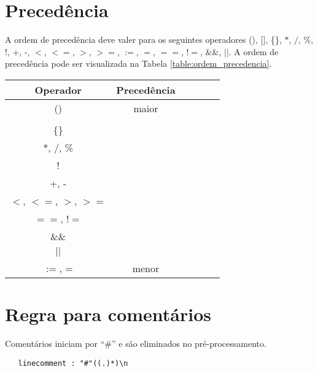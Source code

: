 \section{Precedência}
A ordem de precedência deve valer para os seguintes operadores (), [], \{\}, $*$, $/$, \%, !, +, -, $<$, $<=$, $>$, $>=$, $:=$, $=$, $==$, $!=$, $\&\&$, $||$. A ordem de precedência pode ser visualizada na Tabela \ref{table:ordem_precedencia}.

\begin{table*}[h]
\renewcommand{\arraystretch}{1.34}
\centering
\begin{tabular}{| c | c | c | c | c | c |}
\hline
\bfseries Operador & \bfseries Precedência  \\
\hline
() & maior \\ \hline
[] &  \\ \hline
\{\} &  \\ \hline
 *, /, \% & \\ \hline
  ! & \\ \hline
 +, - & \\ \hline
$<$, $<=$, $>$, $>=$ & \\ \hline
$==$, $!=$ & \\ \hline
\&\& & \\ \hline
$||$ & \\ \hline
$:=$, = & menor\\ \hline
\end{tabular}
\caption{Ordem de precedência para os operadores.}
\label{table:ordem_precedencia}
\end{table*}

\section{Regra para comentários}
    Comentários iniciam por ``\#'' e são eliminados no pré-processamento.
\begin{verbatim}
   linecomment : "#"((.)*)\n
\end{verbatim}